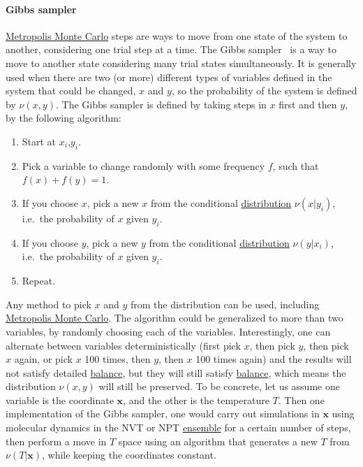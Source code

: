 \documentclass[9pt,review]{livecoms}
\newcommand{\vx}{\mathbf{x}}
\begin{document}
\hypertarget{ref:GibbsSampler} {\paragraph{Gibbs sampler}}
\hyperlink{ref:MetropolisMonteCarlo} {Metropolis Monte Carlo} steps are ways to move from one state of the system to another, considering one trial step at a time.  The Gibbs sampler~\cite{shirts_gibbssamp} is a  way to move to another state considering many trial states simultaneously. It is generally used when there are two (or more) different types of variables defined in the system that could be changed, $x$ and $y$, so the probability of the system is defined by $\nu(x,y)$. The Gibbs sampler is defined by taking steps in $x$ first and then $y$, by the following algorithm:
\begin{enumerate}
\item Start at $x_i$,$y_i$.
\item Pick a variable to change randomly with some frequency $f$, such that $f(x)+f(y)=1$.
\item If you choose $x$, pick a new $x$ from the conditional \hyperlink{ref:Distribution} {distribution} $\nu(x|y_i)$, i.e.~the probability of $x$ given $y_i$.
\item If you choose $y$, pick a new $y$ from the conditional \hyperlink{ref:Distribution} {distribution} $\nu(y|x_i)$, i.e.~the probability of $x$ given $y_i$.
\item Repeat.
\end{enumerate}
Any method to pick $x$ and $y$ from the distribution can be used, including \hyperlink{ref:MetropolisMonteCarlo} {Metropolis Monte Carlo}. The algorithm could be generalized to more than two variables, by randomly choosing each of the variables. Interestingly, one can alternate between variables deterministically (first pick $x$, then pick $y$, then pick $x$ again, or pick $x$ 100 times, then $y$, then $x$ 100 times again) and the results will not satisfy detailed \hyperlink{ref:Balance} {balance}, but they will still satisfy \hyperlink{ref:Balance} {balance}, which means the distribution $\nu(x,y)$ will still be preserved.
To be concrete, let us assume one variable is the coordinate $\vx$, and the other is the temperature $T$. Then one implementation of the Gibbs sampler, one would carry out simulations in $\vx$ using molecular dynamics in the NVT or NPT \hyperlink{ref:Ensemble} {ensemble} for a certain number of steps, then perform a move in $T$ space using an algorithm that generates a new $T$ from $\nu(T|\vx)$, while keeping the coordinates constant.
\end{document}
